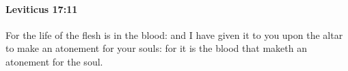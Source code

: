 
		\paragraph{Leviticus 17:11} %
			\label{LEVITICUS-17-11}

			For the life of the flesh is in the blood: and I have given it to you upon the altar to make an atonement for your souls: for it is the blood that maketh an atonement for the soul.

